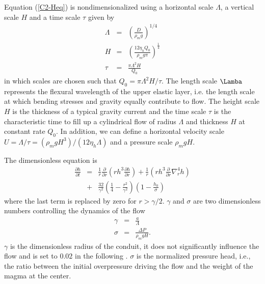 Equation (\ref{C2-Heq}) is nondimensionalized using a horizontal scale
$\Lambda$, a vertical scale $H$ and a time scale $\tau$ given by
\begin{eqnarray}
  \Lambda &=& \left(\frac{D}{\rho_m g}\right)^{1/4}\label{C2-L1}\\
  H&=&\left       (\frac{12\eta_h      Q_{0}}{\rho_{m}g       \pi}\right      )
       ^{\frac{1}{4}} \label{C2-H1}\\
  \tau&=&\frac{\pi \Lambda^{2} H}{Q_{0}}\label{C2-T1}
\end{eqnarray}
in which scales are chosen such  that $Q_0 = \pi\Lambda^2 H/\tau$. The
length scale $\Lamba$ represents the  flexural wavelength of the upper
elastic layer,  i.e. the  length scale at  which bending  stresses and
gravity  equally contribute  to flow.   The  height scale  $H$ is  the
thickness of  a typical gravity current  and the time scale  $\tau$ is
the  characteristic time  to  fill  up a  cylindrical  flow of  radius
$\Lambda$ and thickness  $H$ at constant rate $Q_0$.   In addition, we
can       define        a       horizontal        velocity       scale
$U=\Lambda/\tau=\left(\rho_m           g           H^3\right)/\left(12
  \eta_h\Lambda\right)$ and a pressure scale $\rho_m g H$.

The dimensionless equation is
\begin{eqnarray}
  \frac{\partial h}{\partial t}& =&\frac{1}{ r}
                                    \frac{\partial}{\partial r}  \left( rh^3  \frac{\partial h}{\partial
                                    r}\right)+\frac{1}{ r} \left( rh^3
                                    \frac{\partial}{\partial
                                    r}\nabla_r^4h\right)\nonumber\\
                               &+&
                                   \frac{32}{\gamma^{2}}\left(\frac{1}{4}-\frac{r^{2}}{\gamma^{2}}\right)\left(1-\frac{h_0}{\sigma}\right)
                                   \label{C2-mainEq}
\end{eqnarray}
where the last term is replaced by zero for $r>\gamma/2$. $\gamma$ and
$\sigma$ are two dimensionless numbers controlling the dynamics of the
flow
\begin{eqnarray}
  \gamma &=& \frac{a}{\Lambda}\\
  \sigma &=& \frac{\Delta P}{\rho_m g H}.
\end{eqnarray}
$\gamma$  is the  dimensionless radius  of  the conduit,  it does  not
significantly influence the flow and is set to $0.02$ in the following
\citep{Michaut:2009jx,Michaut:2011kg}.   $\sigma$  is  the  normalized
pressure  head,  i.e.,  the  ratio between  the  initial  overpressure
driving the flow and the weight of the magma at the center.
	 
